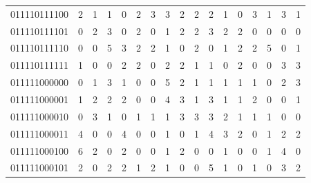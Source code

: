 \documentclass[10pt,a4paper]{article}
\begin{document}
\begin{longtable}{ |c|c|c|c|c|c|c|c|c|c|c|c|c|c|c|c|c| }
    011110111100              & 2                            & 1                                & 1                            & 0                              & 2   & 3   & 3   & 2   & 2   & 2   & 1   & 0   & 3   & 1   & 3   & 1   \\
    011110111101              & 0                            & 2                                & 3                            & 0                              & 2   & 0   & 1   & 2   & 2   & 3   & 2   & 2   & 0   & 0   & 0   & 0   \\
    011110111110              & 0                            & 0                                & 5                            & 3                              & 2   & 2   & 1   & 0   & 2   & 0   & 1   & 2   & 2   & 5   & 0   & 1   \\
    011110111111              & 1                            & 0                                & 0                            & 2                              & 2   & 0   & 2   & 2   & 1   & 1   & 0   & 2   & 0   & 0   & 3   & 3   \\
    011111000000              & 0                            & 1                                & 3                            & 1                              & 0   & 0   & 5   & 2   & 1   & 1   & 1   & 1   & 1   & 0   & 2   & 3   \\
    011111000001              & 1                            & 2                                & 2                            & 2                              & 0   & 0   & 4   & 3   & 1   & 3   & 1   & 1   & 2   & 0   & 0   & 1   \\
    011111000010              & 0                            & 3                                & 1                            & 0                              & 1   & 1   & 1   & 3   & 3   & 3   & 2   & 1   & 1   & 1   & 0   & 0   \\
    011111000011              & 4                            & 0                                & 0                            & 4                              & 0   & 0   & 1   & 0   & 1   & 4   & 3   & 2   & 0   & 1   & 2   & 2   \\
    011111000100              & 6                            & 2                                & 0                            & 2                              & 0   & 0   & 1   & 2   & 0   & 0   & 1   & 0   & 0   & 1   & 4   & 0   \\
    011111000101              & 2                            & 0                                & 2                            & 2                              & 1   & 2   & 1   & 0   & 0   & 5   & 1   & 0   & 1   & 0   & 3   & 2   \\

\end{longtable}
\end{document}
